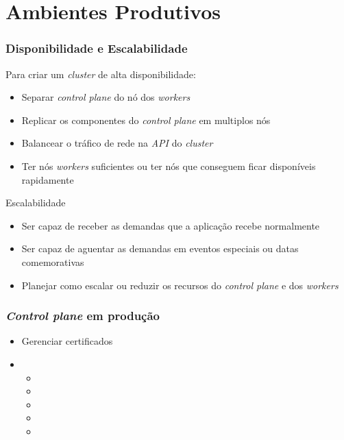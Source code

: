\section{Ambientes Produtivos}

\begin{frame}
\frametitle{Disponibilidade e Escalabilidade}

Para criar um \textit{cluster} de alta disponibilidade:

\begin{itemize}
	\item Separar \textit{control plane} do nó dos \textit{workers}
	\item Replicar os componentes do \textit{control plane} em multiplos nós
	\item Balancear o tráfico de rede na \textit{API} do \textit{cluster}
	\item Ter nós \textit{workers} suficientes ou ter nós que conseguem ficar disponíveis rapidamente
\end{itemize}

Escalabilidade

\begin{itemize}
	\item Ser capaz de receber as demandas que a aplicação recebe normalmente
	\item Ser capaz de aguentar as demandas em eventos especiais ou datas comemorativas
	\item Planejar como escalar ou reduzir os recursos do \textit{control plane} e dos \textit{workers}
\end{itemize}
\end{frame}

\begin{frame}
\frametitle{\textit{Control plane} em produção}
\begin{itemize}
	\item Gerenciar certificados
	\item {}
		\begin{itemize}
			\item {}
			\item {}
			\item {}
			\item {}
			\item {}
		\end{itemize}
\end{itemize}
\end{frame}

